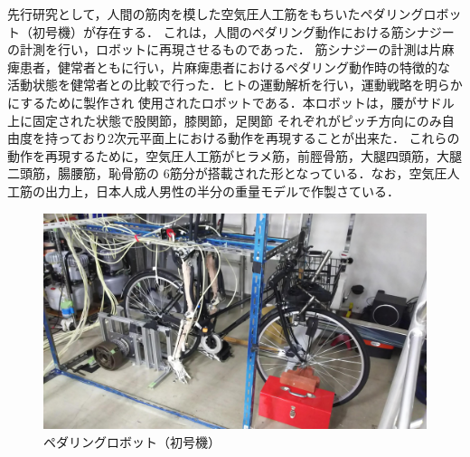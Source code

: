 先行研究として，人間の筋肉を模した空気圧人工筋をもちいたペダリングロボット（初号機）が存在する．
これは，人間のペダリング動作における筋シナジーの計測を行い，ロボットに再現させるものであった．
筋シナジーの計測は片麻痺患者，健常者ともに行い，片麻痺患者におけるペダリング動作時の特徴的な
活動状態を健常者との比較で行った．ヒトの運動解析を行い，運動戦略を明らかにするために製作され
使用されたロボットである．本ロボットは，腰がサドル上に固定された状態で股関節，膝関節，足関節
それぞれがピッチ方向にのみ自由度を持っており2次元平面上における動作を再現することが出来た．
これらの動作を再現するために，空気圧人工筋がヒラメ筋，前脛骨筋，大腿四頭筋，大腿二頭筋，腸腰筋，恥骨筋の
6筋分が搭載された形となっている．なお，空気圧人工筋の出力上，日本人成人男性の半分の重量モデルで作製さている．%
\begin{figure}[h]
 \begin{center}
  \includegraphics[width=0.75\columnwidth,clip,bb=0 0 2765 1555]{Photo/1.緒言/1st.jpg}
  \caption{ペダリングロボット（初号機）}
  \label{初号機}
  \end{center} %
\end{figure}

\newpage

